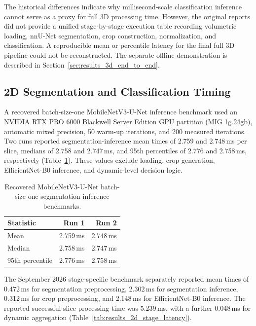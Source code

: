 The historical differences indicate why millisecond-scale classification inference cannot serve as a proxy for full 3D processing time. However, the original reports did not provide a unified stage-by-stage execution table recording volumetric loading, nnU-Net segmentation, crop construction, normalization, and classification. A reproducible mean or percentile latency for the final full 3D pipeline could not be reconstructed. The separate offline demonstration is described in Section~\ref{sec:results_3d_end_to_end}.

\subsection{2D Segmentation and Classification Timing}
\label{subsec:results_2d_latency}

A recovered batch-size-one MobileNetV3-U-Net inference benchmark used an NVIDIA RTX PRO 6000 Blackwell Server Edition GPU partition (MIG 1g.24gb), automatic mixed precision, 50 warm-up iterations, and 200 measured iterations. Two runs reported segmentation-inference mean times of 2.759 and 2.748\,ms per slice, medians of 2.758 and 2.747\,ms, and 95th percentiles of 2.776 and 2.758\,ms, respectively (Table~\ref{tab:results_2d_inference_benchmark}). These values exclude loading, crop generation, EfficientNet-B0 inference, and dynamic-level decision logic.

\begin{table}[htbp]
\centering
\caption{Recovered MobileNetV3-U-Net batch-size-one segmentation-inference benchmarks.}
\label{tab:results_2d_inference_benchmark}
\begin{tabular}{lrr}
\hline
Statistic & Run 1 & Run 2 \\
\hline
Mean & 2.759\,ms & 2.748\,ms \\
Median & 2.758\,ms & 2.747\,ms \\
95th percentile & 2.776\,ms & 2.758\,ms \\
\hline
\end{tabular}
\end{table}

The September 2026 stage-specific benchmark separately reported mean times of 0.472\,ms for segmentation preprocessing, 2.302\,ms for segmentation inference, 0.312\,ms for crop preprocessing, and 2.148\,ms for EfficientNet-B0 inference. The reported successful-slice processing time was 5.239\,ms, with a further 0.048\,ms for dynamic aggregation (Table~\ref{tab:results_2d_stage_latency}).

